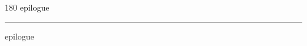 
\begin{frame}
\begin{center}
\begin{turn}{180}
{\fontsize{2.5cm}{1em}\selectfont epilogue}
\end{turn}
\vspace{1em}\par  
\hrule
\vspace{1em}\par  
{\fontsize{2.5cm}{1em}\selectfont epilogue}
\end{center}
\end{frame}
